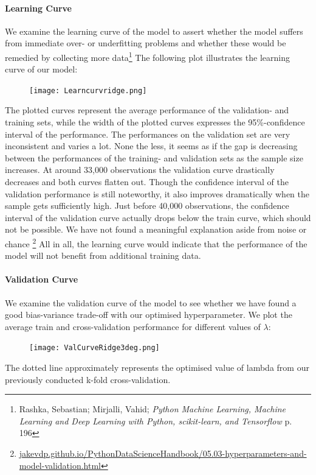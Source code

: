 \documentclass[12pt,a4paper]{article}
\begin{document}
\paragraph{Learning Curve\newline}
We examine the learning curve of the model to assert whether the model suffers from immediate over- or underfitting problems and whether these would be remedied by collecting more data\footnote{Rashka, Sebastian; Mirjalli, Vahid; \textit{Python Machine Learning, Machine Learning and Deep Learning with Python, scikit-learn, and Tensorflow} p. 196}
The following plot illustrates the learning curve of our model:
\begin{figure}[H]
\centering
\caption{}
\texttt{[image: Learncurvridge.png]}
\end{figure}
The plotted curves represent the average performance of the validation- and training sets, while the width of the plotted curves expresses the 95\%-confidence interval of the performance.  
The performances on the validation set are very inconsistent and varies a lot. None the less, it seems as if the gap is decreasing between the performances of the training- and validation sets as the sample size increases. 
At around 33,000 observations the validation curve drastically decreases and both curves flatten out. Though the confidence interval of the validation performance is still noteworthy, it also improves dramatically when the sample gets sufficiently high. Just before 40,000 observations, the confidence interval of the validation curve actually drops below the train curve, which should not be possible. We have not found a meaningful explanation aside from noise or chance \footnote{\href{https://jakevdp.github.io/PythonDataScienceHandbook/05.03-hyperparameters-and-model-validation.html}{jakevdp.github.io/PythonDataScienceHandbook/05.03-hyperparameters-and-model-validation.html}} 
All in all, the learning curve would indicate that the performance of the model will not benefit from additional training data. 

\paragraph{Validation Curve\newline}
We examine the validation curve of the model to see whether we have found a good bias-variance trade-off with our optimised hyperparameter. We plot the average train and cross-validation performance for different values of $\lambda$: 
\begin{figure}[H]
\centering
\caption{}
\texttt{[image: ValCurveRidge3deg.png]}
\end{figure}
The dotted line approximately represents the optimised value of lambda from our previously conducted k-fold cross-validation. 
\end{document}
